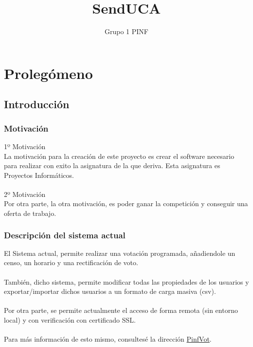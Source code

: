 \documentclass[12pt,letterpaper]{report}
\title{SendUCA}
\author{Grupo 1 PINF}
\begin{document}
	\maketitle
	\thispagestyle{empty}
	\newpage
	\tableofcontents
	
	
	
	\lstset{language=bash, numbers=left, numberstyle=\tiny, numbersep=10pt, firstnumber=1, stepnumber=1}
	
\chapter{Prolegómeno}		
\section{Introducción}
	\subsection{Motivación}
		\noindent 1º Motivación\\
		La motivación para la creación de este proyecto es crear el software necesario
		para realizar con exito la asignatura de la que deriva. Esta asignatura es Proyectos Informáticos.
		\\~\\
		\noindent 2º Motivación\\
		Por otra parte, la otra motivación, es poder ganar la competición y conseguir
		una oferta de trabajo.
	\subsection{Descripción del sistema actual}
		El Sistema actual, permite realizar una votación programada, añadiendole un censo, un horario
		y una rectificación de voto.
		\\~\\
		También, dicho sistema, permite modificar todas las propiedades de los usuarios y exportar/importar
		dichos usuarios a un formato de carga masiva (csv).
		\\~\\
		Por otra parte, se permite actualmente el acceso de forma remota (sin entorno local) y con verificación
		con certificado SSL.
		\\~\\
		Para más información de esto mismo, consultesé la dirección \href{http://salker.pythonanywhere.com/}{PinfVot}.
\end{document}
